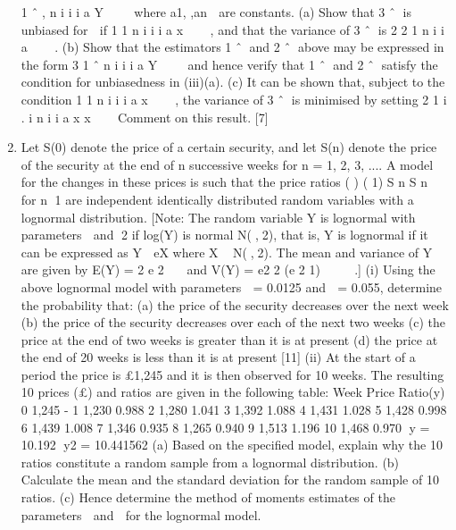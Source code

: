 \documentclass[a4paper,12pt]{article}
\begin{document}
\begin{enumerate}
1
ˆ ,
n
i i
i
a Y

  where a1, ,an 
are constants.
(a) Show that 3 ˆ is unbiased for  if 1 1 n
i i i a x

  , and that the variance
of 3 ˆ is 2 2
1
n
i i a

  .
(b) Show that the estimators 1 ˆ and 2 ˆ above may be expressed in the
form 3
1
ˆ
n
i i
i
a Y

  and hence verify that 1 ˆ and 2 ˆ satisfy the
condition for unbiasedness in (iii)(a).
(c) It can be shown that, subject to the condition 1 1 n
i i i a x

  , the
variance of 3 ˆ is minimised by setting
2
1
i .
i n
i i
a x
x



Comment on this result. [7]
\item Let S(0) denote the price of a certain security, and let S(n) denote the price of the
security at the end of n successive weeks for n = 1, 2, 3, .... A model for the changes
in these prices is such that the price ratios ( )
( 1)
S n
S n
for n 1 are independent
identically distributed random variables with a lognormal distribution.
[Note: The random variable Y is lognormal with parameters  and 2 if log(Y) is
normal N(,2), that is, Y is lognormal if it can be expressed as Y  eX where
X ~ N(,2). The mean and variance of Y are given by E(Y) =
2
e 2

 and
V(Y) = e2 2 (e 2 1)  
 .]
(i) Using the above lognormal model with parameters  = 0.0125 and  = 0.055,
determine the probability that:
(a) the price of the security decreases over the next week
(b) the price of the security decreases over each of the next two weeks
(c) the price at the end of two weeks is greater than it is at present
(d) the price at the end of 20 weeks is less than it is at present
[11]
(ii) At the start of a period the price is £1,245 and it is then observed for 10 weeks.
The resulting 10 prices (£) and ratios are given in the following table:
Week Price Ratio(y)
0 1,245 -
1 1,230 0.988
2 1,280 1.041
3 1,392 1.088
4 1,431 1.028
5 1,428 0.998
6 1,439 1.008
7 1,346 0.935
8 1,265 0.940
9 1,513 1.196
10 1,468 0.970
y = 10.192 y2 = 10.441562
(a) Based on the specified model, explain why the 10 ratios constitute a
random sample from a lognormal distribution.
(b) Calculate the mean and the standard deviation for the random sample
of 10 ratios.
(c) Hence determine the method of moments estimates of the parameters 
and  for the lognormal model. 
\end{enumerate}
\newpage
\end{document}
